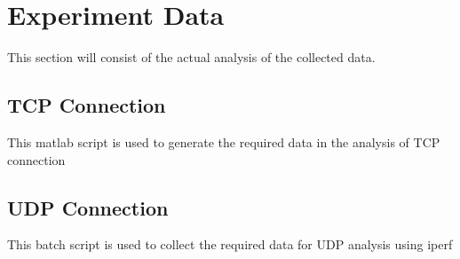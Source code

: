 \documentclass[aps,letterpaper,10pt]{revtex4}
\begin{document}
\newpage
\section{Experiment Data}
This section will consist of the actual analysis of the collected data.  \vspace{5mm}
    \subsection{TCP Connection}
    This matlab script is used to generate the required data in the analysis of TCP connection    
    	
    	\vspace{3mm}
        \newpage
    \subsection{UDP Connection}
    This batch script is used to collect the required data for UDP analysis using iperf
        
    	\vspace{3mm}

                
                

\end{document}
